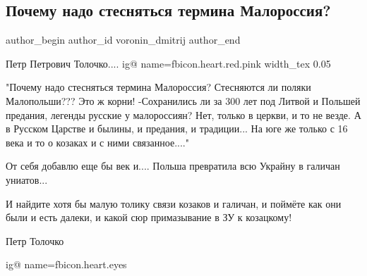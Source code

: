  
 
 
 
 
 
\subsection{Почему надо стесняться термина Малороссия?}
\label{sec:23_08_2021.fb.voronin_dmitrij.1.malorossia_tolochko}
 
\ifcmt
 author_begin
   author_id voronin_dmitrij
 author_end
\fi

Петр Петрович Толочко....
\ifcmt
  ig@ name=fbicon.heart.red.pink
	width_tex 0.05
\fi

"Почему надо стесняться термина Малороссия?
Стесняются ли поляки Малопольши???
Это ж корни!
-Сохранились ли за 300 лет под Литвой и Польшей предания, легенды русские у малороссиян?
Нет, только в церкви, и то не везде.
А в Русском Царстве и былины, и предания, и традиции...
На юге же только с 16 века и то о козаках и с ними связанное...."

От себя добавлю еще бы век и.... Польша превратила всю Украйну в галичан униатов...

И найдите хотя бы малую толику связи козаков и галичан, и поймёте как они были и
есть далеки, и какой сюр примазывание в ЗУ к козацкому!

Петр Толочко 

\ifcmt
  ig@ name=fbicon.heart.eyes 
\fi
